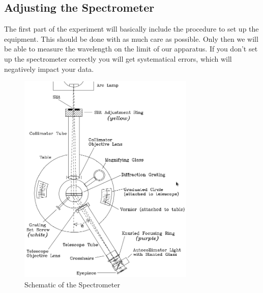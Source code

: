 \subsection{Adjusting the Spectrometer}
The first part of the experiment will basically include the procedure to set up the equipment. This should be done with as much care as possible. Only then we will be able to measure the wavelength on the limit of our apparatus. If you don't set up the spectrometer correctly you will get systematical errors, which will negatively impact your data.

\begin{figure}[h!]
\centering
\includegraphics[width=0.75\textwidth]{./Exp9/pic/image7.png}
\caption{Schematic of the Spectrometer}
\end{figure}

